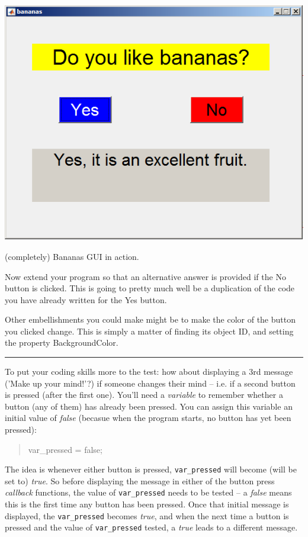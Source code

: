 \documentclass{tufte-book} %
\newenvironment{docspec}{\begin{quotation}\ttfamily\parskip0pt\parindent0pt\ignorespaces}{\end{quotation}}
\begin{document}
\begin{marginfigure}[0.0in]
\includegraphics[width=\linewidth]{chGUI-bananas2.png}
\caption{(completely) Bananas GUI in action.}
\label{fig:chGUI-bananas2}
\end{marginfigure}

Now extend your program so that an alternative answer is provided if the \textsf{No} button is  clicked. This is going to pretty much well be a duplication of the code you have already written for the \textsf{Yes} button.

Other embellishments you could make might be to make the color of the button you clicked change. This is simply a matter of finding its object ID, and setting the property \textsf{BackgroundColor}.

\vspace{1mm}
\noindent\rule{4cm}{0.5pt}
\vspace{2mm}

\noindent To put your coding skills more to the test: how about displaying a 3rd message ('Make up your mind!'?) if someone changes their mind -- i.e. if a second button is pressed (after the first one). You'll need a \textit{variable} to remember whether a button (any of them) has already been pressed. You can assign this variable an initial value of \textit{false} (becasue when the program starts, no button has yet been pressed):
\begin{docspec}
var\_pressed = false;
\end{docspec}
The idea is whenever either button is pressed, \texttt{var\_pressed} will become (will be set to) \textit{true}. So before displaying the message in either of the button press \textit{callback} functions, the value of \texttt{var\_pressed} needs to be tested -- a \textit{false} means this is the first time any button has been pressed. Once that initial message is displayed, the \texttt{var\_pressed} becomes \textit{true}, and when the next time a button is pressed and the value of \texttt{var\_pressed} tested, a \textit{true} leads to a different message. 
\end{document}
